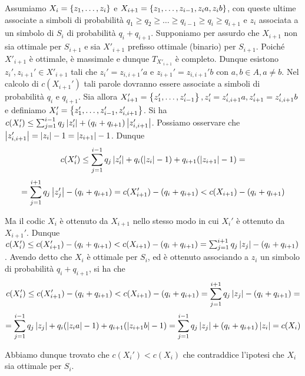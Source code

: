 Assumiamo \(X_i = \set{z_1, \ldots,z_i}\) e \(X_{i+1} = \set{z_1,\ldots,z_{i-1},z_{i}a, z_{i}b}\), con queste ultime associate a simboli di probabilità \(q_1\geq q_2 \geq \ldots \geq q_{i-1} \geq q_i \geq q_{i+1}\) e \(z_i\) associata a un simbolo di \(S_i\) di probabilità \(q_i + q_{i+1}\).
Supponiamo per assurdo che \(X_{i+1}\) non sia ottimale per \(S_{i+1}\) e sia \(X'_{i+1} \) prefisso ottimale (binario) per \(S_{i+1}\).
Poiché \(X'_{i+1}\) è ottimale, è massimale e dunque \(T_{X'_{i+1}}\) è completo. Dunque esistono \(z_i', z_{i+1}' \in X'_{i+1}\) tali che \(z_i' = z_{i,i+1}'a\) e \(z_{i+1}' = z_{i,i+1}'b\) con \(a,b \in A, a \neq b\).
Nel calcolo di \(c(X_{i+1}')\) tali parole dovranno essere associate a simboli di probabilità \(q_i\) e \(q_{i+1}\).
Sia allora \(X_{i+1}' = \set{z_1',\ldots,z_{i-1}'}, z_i'=z_{i,i+1}'a,z_{i+1}' = z_{i,i+1}'b\) e definiamo \(X_i' = \set{z_1',\ldots,z_{i-1}', z_{i,i+1}'}\).
Si ha \(c(X_i') \leq \sum_{j=1}^{i-1} q_j\left|z_i'\right| + (q_i+q_{i+1})\left|z_{i,i+1}'\right|\).
Possiamo osservare che \(\left|z_{i,i+1}'\right| = \left|z_{i}\right|-1 = \left|z_{i+1}\right|-1\).
Dunque
\[c(X_i') \leq \sum_{j=1}^{i-1} q_j\left|z_i'\right| + q_i(\left|z_{i}\right|-1) + q_{i+1}(\left|z_{i+1}\right|-1) = \]
\[=\sum_{j=1}^{i+1} q_j\left|z_j'\right| - (q_i + q_{i+1}) = c(X_{i+1}') - (q_i + q_{i+1}) < c(X_{i+1}) - (q_i + q_{i+1})\]

Ma il codic \(X_i\) è ottenuto da \(X_{i+1}\) nello stesso modo in cui \(X_i'\) è ottenuto da \(X_{i+1}'\).
Dunque \(c(X_i') \leq c(X_{i+1}') - (q_i + q_{i+1}) < c(X_{i+1}) - (q_i + q_{i+1}) = \sum_{j=1}^{i+1} q_j\left|z_j\right| - (q_i + q_{i+1})\).
Avendo detto che \(X_i\) è ottimale per \(S_i\), ed è ottenuto associando a \(z_i\) un simbolo di probabilità \(q_i + q_{i+1}\), si ha che
\[c(X_i') \leq c(X_{i+1}') - (q_i + q_{i+1}) < c(X_{i+1}) - (q_i + q_{i+1}) = \sum_{j=1}^{i+1} q_j\left|z_j\right| - (q_i + q_{i+1}) = \]
\[=\sum_{j=1}^{i-1} q_j\left|z_j\right| + q_i(\left|z_i a\right|-1) + q_{i+1}(\left|z_{i+1}b\right|-1) = \sum_{j=1}^{i-1} q_j\left|z_j\right| + (q_i+q_{i+1})\left|z_{i}\right| = c(X_i)\]

Abbiamo dunque trovato che \(c(X_i')<c(X_i)\) che contraddice l'ipotesi che \(X_i\) sia ottimale per \(S_i\).